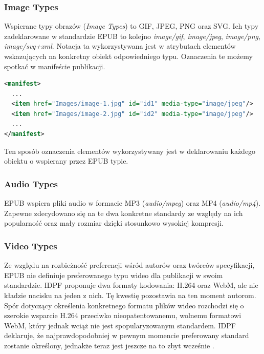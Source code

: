 \subsubsection*{Image Types}

Wspierane typy obrazów (\textit{Image Types}) to GIF, JPEG, PNG oraz SVG. Ich typy zadeklarowane w standardzie EPUB to kolejno \textit{image/gif}, \textit{image/jpeg}, \textit{image/png}, \textit{image/svg+xml}. Notacja ta wykorzystywana jest w atrybutach elementów wskazujących na konkretny obiekt odpowiedniego typu. Oznaczenia te możemy spotkać w manifeście publikacji.

\begin{lstlisting}[caption={Przykładowy fragment manifestu znajdującego się w pliku content.opf}, language=XML,label=xyzs]
<manifest>
  ...
  <item href="Images/image-1.jpg" id="id1" media-type="image/jpeg"/>
  <item href="Images/image-2.jpg" id="id2" media-type="image/jpeg"/>
  ...
</manifest>
\end{lstlisting}

Ten sposób oznaczenia elementów wykorzystywany jest w deklarowaniu każdego obiektu o wspierany przez EPUB typie.

\subsubsection*{Audio Types}

EPUB wspiera pliki audio w formacie MP3 (\textit{audio/mpeg}) oraz MP4 (\textit{audio/mp4}). Zapewne zdecydowano się na te dwa konkretne standardy ze względy na ich popularność oraz mały rozmiar dzięki stosunkowo wysokiej kompresji.

\subsubsection*{Video Types}

Ze względu na rozbieżność preferencji wśród autorów oraz twórców specyfikacji, EPUB nie definiuje preferowanego typu wideo dla publikacji w swoim standardzie. IDPF proponuje dwa formaty kodowania: H.264 oraz WebM, ale nie kładzie nacisku na jeden z nich. Tę kwestię pozostawia na ten moment autorom. Spór dotyczący określenia konkretnego formatu plików wideo rozchodzi się o szerokie wsparcie H.264 przeciwko nieopatentowanemu, wolnemu formatowi WebM, który jednak wciąż nie jest spopularyzowanym standardem. IDPF deklaruje, że najprawdopodobniej w pewnym momencie preferowany standard zostanie określony, jednakże teraz jest jeszcze na to zbyt wcześnie \cite{WhatIsEPUB3Video}.

